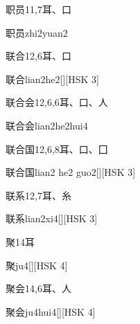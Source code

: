 \begin{entry}{职员}{11,7}{⽿、⼝}
  \begin{phonetics}{职员}{zhi2yuan2}
  \end{phonetics}
\end{entry}

\begin{entry}{联合}{12,6}{⽿、⼝}
  \begin{phonetics}{联合}{lian2he2}[][HSK 3]
  \end{phonetics}
\end{entry}

\begin{entry}{联合会}{12,6,6}{⽿、⼝、⼈}
  \begin{phonetics}{联合会}{lian2he2hui4}
  \end{phonetics}
\end{entry}

\begin{entry}{联合国}{12,6,8}{⽿、⼝、⼞}
  \begin{phonetics}{联合国}{lian2 he2 guo2}[][HSK 3]
  \end{phonetics}
\end{entry}

\begin{entry}{联系}{12,7}{⽿、⽷}
  \begin{phonetics}{联系}{lian2xi4}[][HSK 3]
  \end{phonetics}
\end{entry}

\begin{entry}{聚}{14}{⽿}
  \begin{phonetics}{聚}{ju4}[][HSK 4]
  \end{phonetics}
\end{entry}

\begin{entry}{聚会}{14,6}{⽿、⼈}
  \begin{phonetics}{聚会}{ju4hui4}[][HSK 4]
  \end{phonetics}
\end{entry}

